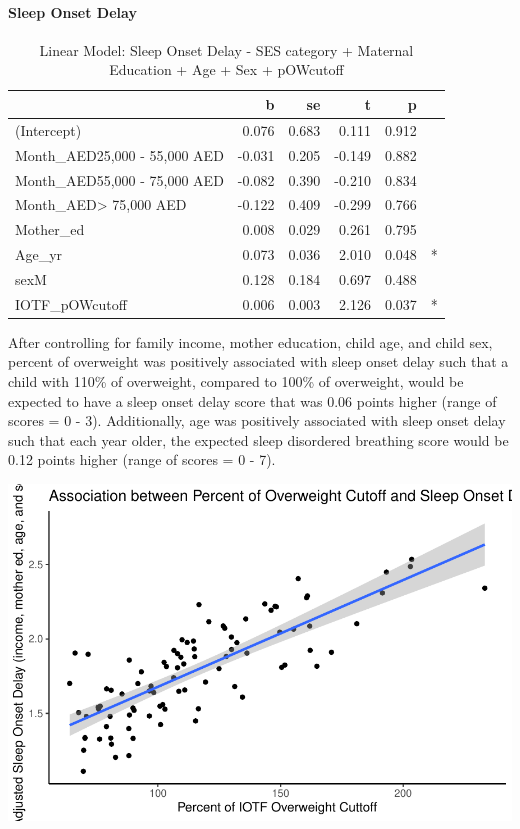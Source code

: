 \documentclass[
]{article}
\begin{document}
\hypertarget{sleep-onset-delay}{%
\paragraph{Sleep Onset Delay}\label{sleep-onset-delay}}

\begin{table}[!h]

\caption{\label{tab:IOTF_pOWcutoff_sleepdelay}Linear Model: Sleep Onset Delay - SES category + Maternal Education + Age + Sex + pOWcutoff}
\centering
\begin{tabular}[t]{lrrrrl}
\toprule
  & b & se & t & p &  \\
\midrule
(Intercept) & 0.076 & 0.683 & 0.111 & 0.912 & \\
Month\_AED25,000 - 55,000 AED & -0.031 & 0.205 & -0.149 & 0.882 & \\
Month\_AED55,000 - 75,000 AED & -0.082 & 0.390 & -0.210 & 0.834 & \\
Month\_AED> 75,000 AED & -0.122 & 0.409 & -0.299 & 0.766 & \\
Mother\_ed & 0.008 & 0.029 & 0.261 & 0.795 & \\
\addlinespace
Age\_yr & 0.073 & 0.036 & 2.010 & 0.048 & *\\
sexM & 0.128 & 0.184 & 0.697 & 0.488 & \\
IOTF\_pOWcutoff & 0.006 & 0.003 & 2.126 & 0.037 & *\\
\bottomrule
\end{tabular}
\end{table}

After controlling for family income, mother education, child age, and
child sex, percent of overweight was positively associated with sleep
onset delay such that a child with 110\% of overweight, compared to
100\% of overweight, would be expected to have a sleep onset delay score
that was 0.06 points higher (range of scores = 0 - 3). Additionally, age
was positively associated with sleep onset delay such that each year
older, the expected sleep disordered breathing score would be 0.12
points higher (range of scores = 0 - 7).

\FloatBarrier

\includegraphics{UAE_MedPaper_Figs/fig-IOTF_pOWcutoff_sleepdelay_adj_plot-1.pdf}
\end{document}
